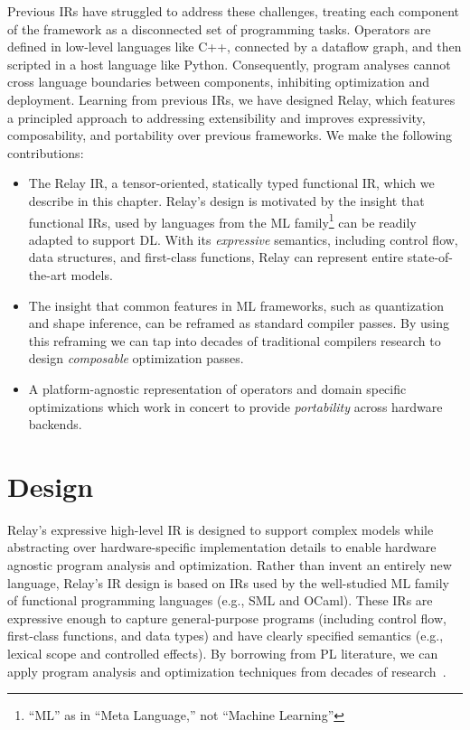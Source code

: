   Previous IRs have struggled to address these challenges, treating each
    component of the framework as a disconnected set of programming tasks.
  Operators are defined in low-level languages like C++,
    connected by a dataflow graph, and then scripted
    in a host language like Python.
  Consequently,
    program analyses cannot cross language boundaries between components,
    inhibiting optimization and deployment.
  Learning from previous IRs, we have designed Relay,
    which features a principled approach to addressing extensibility
    and improves expressivity, composability, and portability
    over previous frameworks.
  We make the following contributions:
  \begin{itemize}
    \item The Relay IR, a tensor-oriented, statically typed
      functional IR,
      which we describe in this chapter.
    Relay's design is motivated by the insight that functional IRs, used by
    languages from the ML family\footnote{``ML'' as in ``Meta Language,'' not
    ``Machine Learning''} can be readily adapted to support DL.
    With its \textit{expressive} semantics,
      including control flow, data structures, and first-class functions,
      Relay can represent entire state-of-the-art models.
    \item The insight that common features in ML frameworks,
      such as quantization and shape inference,
      can be reframed as standard compiler passes.
    By using this reframing we can tap into
      decades of traditional compilers research to design
      \textit{composable} optimization passes.
    \item
      A platform-agnostic representation of operators and domain specific
        optimizations which work in concert to provide \textit{portability}
        across hardware backends.
  \end{itemize}


\section{Design}

Relay's expressive high-level IR is designed to support
  complex models while abstracting over hardware-specific
  implementation details to enable hardware agnostic program
  analysis and optimization.
Rather than invent an entirely new language,
  Relay's IR design is based on IRs used by the well-studied ML family of
  functional programming languages (e.g., SML and OCaml).
These IRs are expressive enough to capture general-purpose programs
  (including control flow, first-class functions, and data types)
  and have clearly specified semantics (e.g., lexical scope and controlled effects).
By borrowing from PL literature,
  we can apply program analysis and optimization techniques from decades of research~\citep{haskell_vector}.

